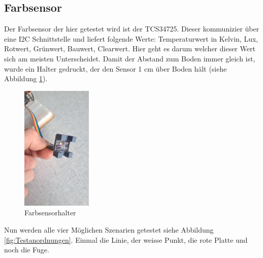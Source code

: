 \documentclass[../main.tex]{subfiles}
\begin{document}
\subsection{Farbsensor}
Der Farbsensor der hier getestet wird ist der TCS34725. Dieser kommunizier über eine I2C Schnittstelle und liefert folgende Werte: Temperaturwert in Kelvin, Lux, Rotwert, Grünwert, Bauwert, Clearwert. Hier geht es darum welcher dieser Wert sich am meisten Unterscheidet. Damit der Abstand zum Boden immer gleich ist, wurde ein Halter gedruckt, der den Sensor 1 cm über Boden hält (siehe Abbildung \ref{fig:Farbsensorhalter}).

\begin{figure}[h] %
    \centering
    \includegraphics[width=0.3\textwidth]{img/sensortest/FarbsensorHalter.jpg} %
    \caption{Farbsensorhalter}
    \label{fig:Farbsensorhalter} %
\end{figure}

Nun werden alle vier Möglichen Szenarien getestet siehe Abbildung \ref{fig:Testanordnungen}. Einmal die Linie, der weisse Punkt, die rote Platte und noch die Fuge.
\end{document}
